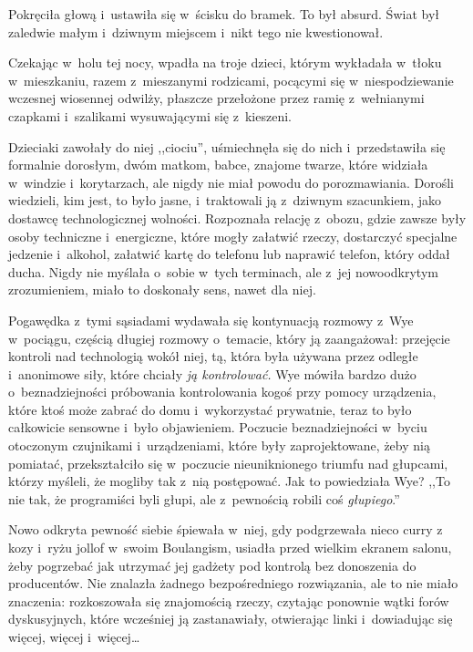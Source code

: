 \documentclass[oneside,polish,11pt,sfheadings]{mwbk}
\begin{document}
Pokręciła głową i~ustawiła się w~ścisku do bramek. To był absurd. Świat
był zaledwie małym i~dziwnym miejscem i~nikt tego nie kwestionował.

Czekając w~holu tej nocy, wpadła na troje dzieci, którym wykładała w~tłoku w~mieszkaniu, razem z~mieszanymi rodzicami, pocącymi się w~niespodziewanie wczesnej wiosennej odwilży, płaszcze przełożone przez
ramię z~wełnianymi czapkami i~szalikami wysuwającymi się z~kieszeni.

Dzieciaki zawołały do niej ,,ciociu'', uśmiechnęła się do nich i~przedstawiła się formalnie dorosłym, dwóm matkom, babce, znajome twarze,
które widziała w~windzie i~korytarzach, ale nigdy nie miał powodu do
porozmawiania. Dorośli wiedzieli, kim jest, to było jasne, i~traktowali
ją z~dziwnym szacunkiem, jako dostawcę technologicznej wolności.
Rozpoznała relację z~obozu, gdzie zawsze były osoby techniczne i~energiczne, które mogły załatwić rzeczy, dostarczyć specjalne jedzenie i~alkohol, załatwić kartę do telefonu lub naprawić telefon, który oddał
ducha. Nigdy nie myślała o~sobie w~tych terminach, ale z~jej
nowoodkrytym zrozumieniem, miało to doskonały sens, nawet dla niej.

Pogawędka z~tymi sąsiadami wydawała się kontynuacją rozmowy z~Wye w~pociągu, częścią długiej rozmowy o~temacie, który ją zaangażował:
przejęcie kontroli nad technologią wokół niej, tą, która była używana
przez odległe i~anonimowe siły, które chciały \textit{ją kontrolować.} Wye
mówiła bardzo dużo o~beznadziejności próbowania kontrolowania kogoś przy
pomocy urządzenia, które ktoś może zabrać do domu i~wykorzystać
prywatnie, teraz to było całkowicie sensowne i~było objawieniem.
Poczucie beznadziejności w~byciu otoczonym czujnikami i~urządzeniami,
które były zaprojektowane, żeby nią pomiatać, przekształciło się w~poczucie nieuniknionego triumfu nad głupcami, którzy myśleli, że mogliby
tak z~nią postępować. Jak to powiedziała Wye? ,,To nie tak, że
programiści byli głupi, ale z~pewnością robili coś \textit{głupiego}.''

Nowo odkryta pewność siebie śpiewała w~niej, gdy podgrzewała nieco curry
z kozy i~ryżu jollof w~swoim Boulangism, usiadła przed wielkim ekranem
salonu, żeby pogrzebać jak utrzymać jej gadżety pod kontrolą bez
donoszenia do producentów. Nie znalazła żadnego bezpośredniego
rozwiązania, ale to nie miało znaczenia: rozkoszowała się znajomością
rzeczy, czytając ponownie wątki forów dyskusyjnych, które wcześniej ją
zastanawiały, otwierając linki i~dowiadując się więcej, więcej i~więcej\ldots 
\end{document}

